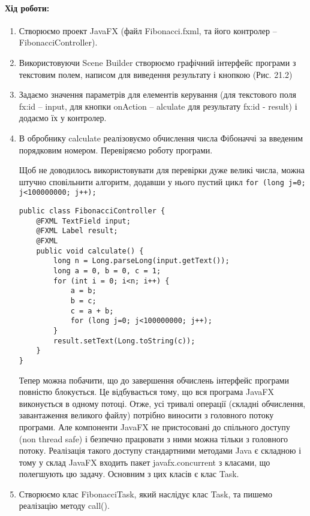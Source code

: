 \paragraph{Хід роботи:}
\begin{enumerate}
	\item Створюємо проект JavaFX (файл Fibonacci.fxml, та його контролер – FibonacciController).

	\item Використовуючи Scene Builder створюємо графічний інтерфейс програми з текстовим полем, написом для виведення результату і кнопкою (Рис. 21.2)

	\item Задаємо значення параметрів для елементів керування (для текстового поля fx:id – input, для кнопки onAction – alculate для результату fx:id - result) і додаємо їх у контролер.

	\item В обробнику calculate реалізовуємо обчислення числа Фібоначчі за введеним порядковим номером. Перевіряємо роботу програми.

	Щоб не доводилось використовувати для перевірки дуже великі числа, можна штучно сповільнити алгоритм, додавши у нього пустий цикл
	\texttt{for (long j=0; j<100000000; j++);}

\begin{verbatim}
public class FibonacciController {
	@FXML TextField input;
	@FXML Label result;
	@FXML
	public void calculate() {
		long n = Long.parseLong(input.getText());
		long a = 0, b = 0, c = 1;
		for (int i = 0; i<n; i++) {
			a = b;
			b = c;
			c = a + b;
			for (long j=0; j<100000000; j++);
		}
		result.setText(Long.toString(c));
	}
}
\end{verbatim}

Тепер можна побачити, що до завершення обчислень інтерфейс програми повністю блокується. 
Це відбувається тому, що вся програма JavaFX виконується в одному потоці. Отже, усі тривалі операції (складні обчислення, завантаження великого файлу) потрібно виносити з головного потоку програми. Але компоненти JavaFX не пристосовані до спільного доступу (non thread safe) і безпечно працювати з ними можна тільки з головного потоку. Реалізація такого доступу стандартними методами Java є складною і тому у склад JavaFX входить пакет javafx.concurrent з класами, що полегшують цю задачу. Основним з цих класів є клас Task. 

	\item Створюємо клас FibonacciTask, який наслідує клас Task, та пишемо реалізацію методу call().


\end{enumerate}
